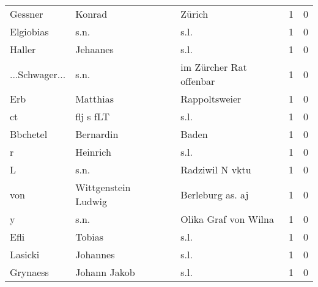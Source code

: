 \documentclass[10pt,a4paper,landscape]{article}
\begin{document}
\begin{longtable}{llllrr}
                  Gessner &                             Konrad &             &                                      Zürich &          1 &         0 \\
                Elgiobias &                               s.n. &             &                                        s.l. &          1 &         0 \\
                   Haller &                           Jehaanes &             &                                        s.l. &          1 &         0 \\
           ...Schwager... &                               s.n. &             &                     im Zürcher Rat offenbar &          1 &         0 \\
                      Erb &                           Matthias &             &                               Rappoltsweier &          1 &         0 \\
                       ct &                          flj s fLT &             &                                        s.l. &          1 &         0 \\
                 Bbchetel &                          Bernardin &             &                                       Baden &          1 &         0 \\
                        r &                           Heinrich &             &                                        s.l. &          1 &         0 \\
                        L &                               s.n. &             &                             Radziwil N vktu &          1 &         0 \\
                      von &                Wittgenstein Ludwig &             &                            Berleburg as. aj &          1 &         0 \\
                        y &                               s.n. &             &                        Olika Graf von Wilna &          1 &         0 \\
                     Efli &                             Tobias &             &                                        s.l. &          1 &         0 \\
                  Lasicki &                           Johannes &             &                                        s.l. &          1 &         0 \\
                 Grynaess &                       Johann Jakob &             &                                        s.l. &          1 &         0 \\

\end{longtable}
\end{document}
